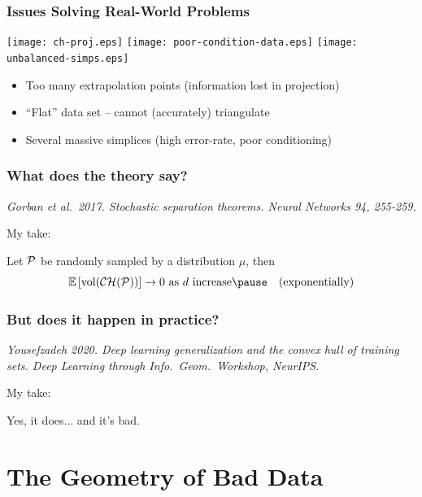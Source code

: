 \documentclass[aspectratio=169]{beamer}
\begin{document}
\begin{frame}\frametitle{Issues Solving Real-World Problems}

\texttt{[image: ch-proj.eps]}
\texttt{[image: poor-condition-data.eps]}
\texttt{[image: unbalanced-simps.eps]}

\begin{itemize}
\pause \item Too many extrapolation points (information lost in projection)
\pause \item ``Flat'' data set -- cannot (accurately) triangulate
\pause \item Several massive simplices (high error-rate, poor conditioning)
\end{itemize}

\end{frame}

\begin{frame}\frametitle{What does the theory say?}

\pause

{\small \it Gorban et al.\ 2017. Stochastic separation theorems.
Neural Networks 94, 255-259.}

\pause
\bigskip

My take:

Let ${\cal P}$ be randomly sampled by a distribution $\mu$,
then
\pause
$$
\mathbb{E}\left[ \text{vol}({\cal CH}({\cal P})) \right] \rightarrow 0
\text{ as $d$ increase}
\pause
\quad
\text{(exponentially)}
$$

\end{frame}

\begin{frame}\frametitle{But does it happen in practice?}

\pause

{\small \it Yousefzadeh 2020. Deep learning generalization and the convex hull
of training sets.
Deep Learning through Info.~Geom.~Workshop, NeurIPS.
}

\pause
\bigskip

My take:

Yes, it does... and it's bad.

\end{frame}

\section{The Geometry of Bad Data}
\end{document}
